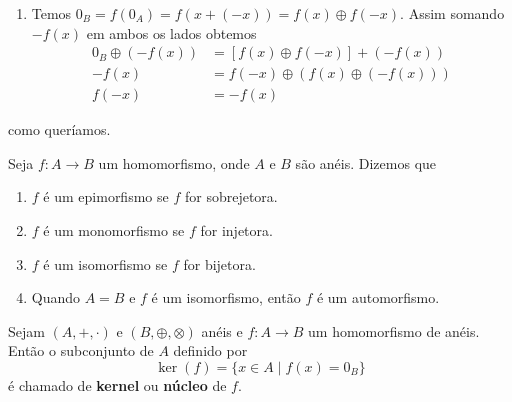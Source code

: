 \documentclass{beamer}
\begin{document}
    \begin{frame}
        \begin{enumerate}[label={\roman*})]
            \conti
            \item Temos $0_B = f(0_A) = f(x + (-x)) = f(x)\oplus f(-x)$. Assim somando $-f(x)$ em ambos os lados obtemos
            \begin{align*}
                0_B\oplus(-f(x)) &= [f(x)\oplus f(-x)] + (-f(x))\\
                -f(x) &= f(-x) \oplus (f(x) \oplus (-f(x)))\\
                f(-x) &= -f(x)
            \end{align*}
        \end{enumerate}
        como queríamos. \hspace{.5cm} \qedsymbol
    \end{frame}

    \begin{frame}
        \begin{definicao}Seja $f:A\rightarrow B$ um homomorfismo, onde $A$ e $B$ s{\~a}o an{\'e}is. Dizemos que
            \begin{enumerate}[label={\roman*})]
                \item $f$ {\'e} um epimorfismo se $f$ for sobrejetora.

                \vspace{.5cm}

                \item $f$ {\'e} um monomorfismo se $f$ for injetora.

                \vspace{.5cm}
                
                \item $f$ {\'e} um isomorfismo se $f$ for bijetora.

                \vspace{.5cm}
                
                \item Quando $A=B$ e $f$ {\'e} um isomorfismo, ent{\~a}o $f$ {\'e} um automorfismo.

                \vspace{.5cm}
                
            \end{enumerate}
        \end{definicao}
    \end{frame}

    \begin{frame}
        \begin{definicao}
            Sejam $(A, +, \cdot)$ e $(B, \oplus, \otimes)$ an\'eis e $f : A \to B$ um homomorfismo de an\'eis. Ent\~ao o subconjunto de $A$ definido por
            \[
                \ker(f) = \{ x \in A \mid f(x) = 0_B\}
            \]
            \'e chamado de \textbf{kernel} ou \textbf{n\'ucleo} de $f$.
        \end{definicao}
    \end{frame}
\end{document}
